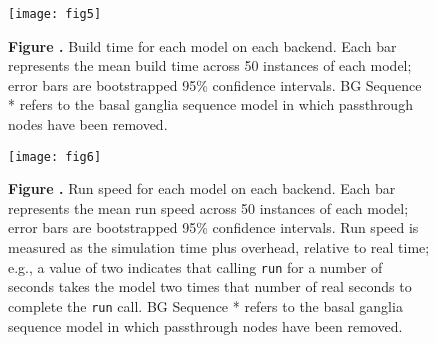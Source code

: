 \documentclass{frontiersSCNS}
\begin{document}
\begin{figure}[!ht]
\begin{center}
  \texttt{[image: fig5]}
\end{center}
\textbf{\label{fig:05} Figure .}
       {Build time for each model on each backend. Each bar represents
         the mean build time across 50 instances of each model;
         error bars are bootstrapped 95\% confidence intervals.
         BG Sequence * refers to the basal ganglia sequence model
         in which passthrough nodes have been removed.}
\end{figure}

\begin{figure}[!ht]
\begin{center}
  \texttt{[image: fig6]}
\end{center}
\textbf{\label{fig:06} Figure .}
       {Run speed for each model on each backend. Each bar represents
         the mean run speed across 50 instances of each model;
         error bars are bootstrapped 95\% confidence intervals.
         Run speed is measured as the simulation time plus overhead,
         relative to real time; e.g., a value of two indicates that
         calling \texttt{run} for a number of seconds takes
         the model two times that number of real seconds to complete the
         \texttt{run} call.
         BG Sequence * refers to the basal ganglia sequence model
         in which passthrough nodes have been removed.}

\end{figure}
\end{document}
